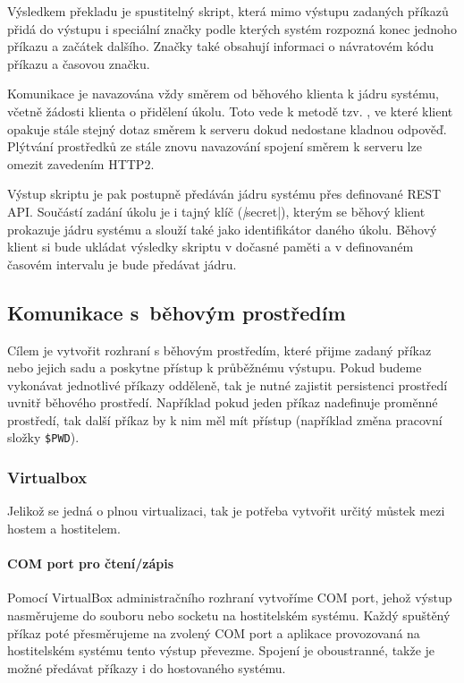 Výsledkem překladu je spustitelný skript, která mimo výstupu zadaných příkazů přidá do výstupu i speciální značky podle kterých systém rozpozná konec jednoho příkazu a začátek dalšího.
Značky také obsahují informaci o návratovém kódu příkazu a časovou značku.

Komunikace je navazována vždy směrem od běhového klienta k jádru systému, včetně žádosti klienta o přidělení úkolu.
Toto vede k metodě tzv. , ve které klient opakuje stále stejný dotaz směrem k serveru dokud nedostane kladnou odpověď.
Plýtvání prostředků ze stále znovu navazování spojení směrem k serveru lze omezit zavedením HTTP2. 

Výstup skriptu je pak postupně předáván jádru systému přes definované REST API.
Součástí zadání úkolu je i tajný klíč (\textit|secret|), kterým se běhový klient prokazuje jádru systému a slouží také jako identifikátor daného úkolu.
Běhový klient si bude ukládat výsledky skriptu v dočasné paměti a v definovaném časovém intervalu je bude předávat jádru.

\subsection{Komunikace s~běhovým prostředím}

Cílem je vytvořit rozhraní s běhovým prostředím, které přijme zadaný příkaz nebo jejich sadu a poskytne přístup k průběžnému výstupu.
Pokud budeme vykonávat jednotlivé příkazy odděleně, tak je nutné zajistit persistenci prostředí uvnitř běhového prostředí.
Například pokud jeden příkaz nadefinuje proměnné prostředí, tak další příkaz by k nim měl mít přístup (například změna pracovní složky \verb|$PWD|).

\subsubsection{Virtualbox}

Jelikož se jedná o plnou virtualizaci, tak je potřeba vytvořit určitý můstek mezi hostem a hostitelem.

\paragraph{COM port pro čtení/zápis}

Pomocí VirtualBox administračního rozhraní vytvoříme COM port, jehož výstup nasměrujeme do souboru nebo socketu na hostitelském systému.
Každý spuštěný příkaz poté přesměrujeme na zvolený COM port a aplikace provozovaná na hostitelském systému tento výstup převezme.
Spojení je oboustranné, takže je možné předávat příkazy i do hostovaného systému.
\cite{virtualbox_serial}


